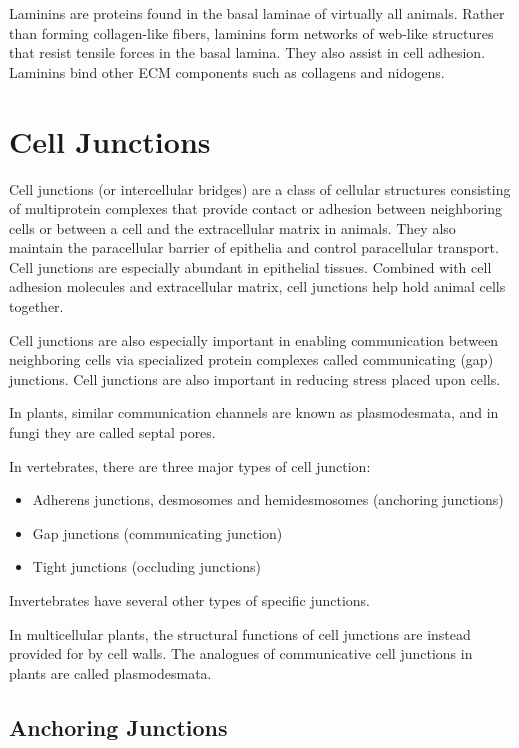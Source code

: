 Laminins are proteins found in the basal laminae of virtually all animals. Rather than forming collagen-like fibers, laminins form networks of web-like structures that resist tensile forces in the basal lamina. They also assist in cell adhesion. Laminins bind other ECM components such as collagens and nidogens.

\hypertarget{cell-junctions}{%
\section{Cell Junctions}\label{cell-junctions}}

Cell junctions (or intercellular bridges) are a class of cellular structures consisting of multiprotein complexes that provide contact or adhesion between neighboring cells or between a cell and the extracellular matrix in animals. They also maintain the paracellular barrier of epithelia and control paracellular transport. Cell junctions are especially abundant in epithelial tissues. Combined with cell adhesion molecules and extracellular matrix, cell junctions help hold animal cells together.

Cell junctions are also especially important in enabling communication between neighboring cells via specialized protein complexes called communicating (gap) junctions. Cell junctions are also important in reducing stress placed upon cells.

In plants, similar communication channels are known as plasmodesmata, and in fungi they are called septal pores.

In vertebrates, there are three major types of cell junction:

\begin{itemize}
\tightlist
\item
  Adherens junctions, desmosomes and hemidesmosomes (anchoring junctions)
\item
  Gap junctions (communicating junction)
\item
  Tight junctions (occluding junctions)
\end{itemize}

Invertebrates have several other types of specific junctions.

In multicellular plants, the structural functions of cell junctions are instead provided for by cell walls. The analogues of communicative cell junctions in plants are called plasmodesmata.

\hypertarget{anchoring-junctions}{%
\subsection{Anchoring Junctions}\label{anchoring-junctions}}

